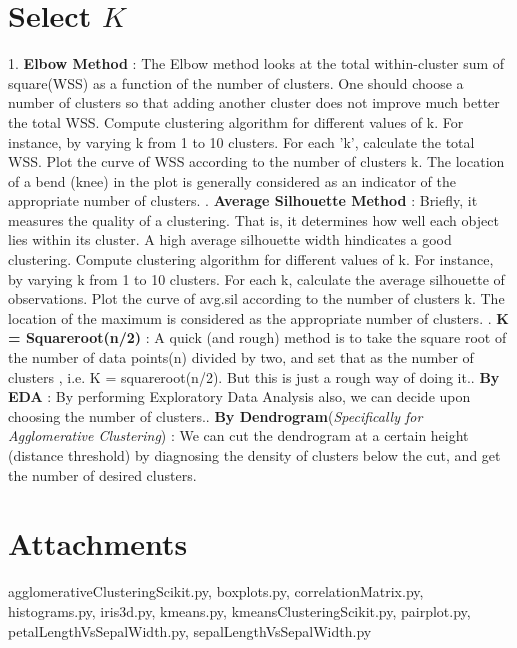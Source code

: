 \documentclass[a4paper, 12pt]{article}
\begin{document}
\section{Select $K$}
1. \textbf{Elbow Method} : The Elbow method looks at the total within-cluster sum of square(WSS) as a function of the number of clusters. One should choose a number of clusters so that adding another cluster does not improve much better the total WSS. Compute clustering algorithm for different values of k. For instance, by varying k from 1 to 10 clusters. For each 'k', calculate the total WSS. Plot the curve of WSS according to the number of clusters k. The location of a bend (knee) in the plot is generally considered as an indicator of the appropriate number of clusters. . \textbf{Average Silhouette Method} : Briefly, it measures the quality of a clustering. That is, it determines how well each object lies within its cluster. A high average silhouette width hindicates a good clustering. Compute clustering algorithm for different values of k. For instance, by varying k from 1 to 10 clusters. For each k, calculate the average silhouette of observations. Plot the curve of avg.sil according to the number of clusters k. The location of the maximum is considered as the appropriate number of clusters. . \textbf{K = Squareroot(n/2)} : A quick (and rough) method is to take the square root of the number of data points(n) divided by two, and set that as the number of clusters , i.e. K = squareroot(n/2). But this is just a rough way of doing it.. \textbf{By EDA} : By performing Exploratory Data Analysis also, we can decide upon choosing the number of clusters.. \textbf{By Dendrogram}(\emph{Specifically for Agglomerative Clustering}) : We can cut the dendrogram at a certain height (distance threshold) by diagnosing the density of clusters below the cut, and get the number of desired clusters.
\section*{Attachments}

agglomerativeClusteringScikit.py, boxplots.py, correlationMatrix.py, histograms.py, iris3d.py, kmeans.py, kmeansClusteringScikit.py, pairplot.py, petalLengthVsSepalWidth.py, sepalLengthVsSepalWidth.py
\end{document}
